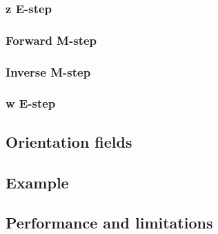 \subsubsection{z E-step}
\subsubsection{Forward M-step}
\subsubsection{Inverse M-step}
\subsubsection{w E-step}
\subsection{Orientation fields}
\subsection{Example}
\subsection{Performance and limitations}